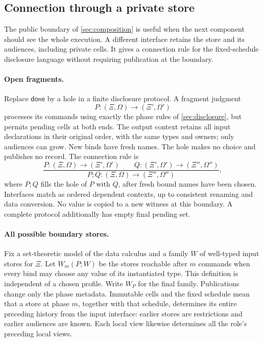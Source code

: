 \subsection{Connection through a private store}
\label{sec:private-connection}

The public boundary of \cref{sec:composition} is useful when the next
component should see the whole execution. A different interface retains
the store and its audiences, including private cells. It gives a
connection rule for the fixed-schedule disclosure language without
requiring publication at the boundary.

\paragraph{Open fragments.}
Replace $\mathsf{done}$ by a hole in a finite disclosure protocol.
A fragment judgment
\[
 P:(\Xi,\Omega)\longrightarrow(\Xi',\Omega')
\]
processes its commands using exactly the phase rules of
\cref{sec:disclosure}, but permits pending cells at both ends. The
output context retains all input declarations in their original order,
with the same types and owners; only audiences can grow. New binds
have fresh names. The hole makes no choice and publishes no record.
The connection rule is
\[
 \frac{P:(\Xi,\Omega)\longrightarrow(\Xi',\Omega')\qquad
       Q:(\Xi',\Omega')\longrightarrow(\Xi'',\Omega'')}
      {P;Q:(\Xi,\Omega)\longrightarrow(\Xi'',\Omega'')},
\]
where $P;Q$ fills the hole of $P$ with $Q$, after fresh bound names
have been chosen. Interfaces match as ordered dependent contexts,
up to consistent renaming and data conversion. No value is copied to
a new witness at this boundary. A complete protocol additionally has
empty final pending set.

\paragraph{All possible boundary stores.}
Fix a set-theoretic model of the data calculus and a family $W$ of
well-typed input stores for $\Xi$. Let $W_m(P;W)$ be the stores
reachable after $m$ commands when every bind may choose any value of
its instantiated type. This definition is independent of a chosen
profile. Write $W_P$ for the final family. Publications change only
the phase metadata. Immutable cells and the fixed schedule mean that
a store at phase $m$, together with that schedule, determines its
entire preceding history from the input interface: earlier stores
are restrictions and earlier audiences are known. Each local view
likewise determines all the role's preceding local views.


